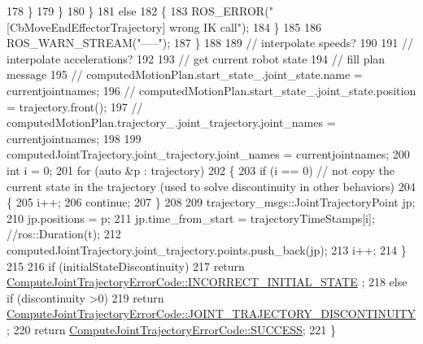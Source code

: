 \begin{DoxyCode}
178                     \}
179                 \}
180             \}
181             \textcolor{keywordflow}{else}
182             \{
183                 ROS\_ERROR(\textcolor{stringliteral}{"[CbMoveEndEffectorTrajectory] wrong IK call"});
184             \}
185 
186             ROS\_WARN\_STREAM(\textcolor{stringliteral}{"-----"});
187         \}
188 
189         \textcolor{comment}{// interpolate speeds?}
190 
191         \textcolor{comment}{// interpolate accelerations?}
192 
193         \textcolor{comment}{// get current robot state}
194         \textcolor{comment}{// fill plan message}
195         \textcolor{comment}{// computedMotionPlan.start\_state\_.joint\_state.name = currentjointnames;}
196         \textcolor{comment}{// computedMotionPlan.start\_state\_.joint\_state.position = trajectory.front();}
197         \textcolor{comment}{// computedMotionPlan.trajectory\_.joint\_trajectory.joint\_names = currentjointnames;}
198 
199         computedJointTrajectory.joint\_trajectory.joint\_names = currentjointnames;
200         \textcolor{keywordtype}{int} i = 0;
201         \textcolor{keywordflow}{for} (\textcolor{keyword}{auto} &p : trajectory)
202         \{
203             \textcolor{keywordflow}{if} (i == 0) \textcolor{comment}{// not copy the current state in the trajectory (used to solve discontinuity in
       other behaviors)}
204             \{
205                 i++;
206                 \textcolor{keywordflow}{continue};
207             \}
208 
209             trajectory\_msgs::JointTrajectoryPoint jp;
210             jp.positions = p;
211             jp.time\_from\_start = trajectoryTimeStamps[i]; \textcolor{comment}{//ros::Duration(t);}
212             computedJointTrajectory.joint\_trajectory.points.push\_back(jp);
213             i++;
214         \}
215 
216         \textcolor{keywordflow}{if} (initialStateDiscontinuity)
217             \textcolor{keywordflow}{return} \hyperlink{namespacecl__move__group__interface_ae5fc1caf9a16ae5ad1c97c2e137a7017a1b748367c8d468cb9b65ecd6b2eab32c}{ComputeJointTrajectoryErrorCode::INCORRECT\_INITIAL\_STATE}
      ;
218         \textcolor{keywordflow}{else} \textcolor{keywordflow}{if} (discontinuity >0)
219             \textcolor{keywordflow}{return} 
      \hyperlink{namespacecl__move__group__interface_ae5fc1caf9a16ae5ad1c97c2e137a7017a3e86842785cd7c42003e516418347c8e}{ComputeJointTrajectoryErrorCode::JOINT\_TRAJECTORY\_DISCONTINUITY}
      ;
220         \textcolor{keywordflow}{return} \hyperlink{namespacecl__move__group__interface_ae5fc1caf9a16ae5ad1c97c2e137a7017ad0749aaba8b833466dfcbb0428e4f89c}{ComputeJointTrajectoryErrorCode::SUCCESS};
221     \}
\end{DoxyCode}
